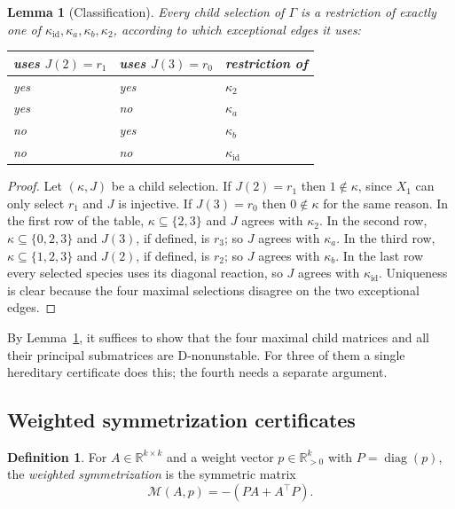 \documentclass[11pt,a4paper]{article}
\newtheorem{lemma}[theorem]{Lemma}
\theoremstyle{definition}
\newtheorem{definition}[theorem]{Definition}
\theoremstyle{remark}
\newcommand{\R}{\mathbb{R}}
\newcommand{\diag}{\operatorname{diag}}
\newcommand{\Sym}{\mathcal{M}}
\begin{document}
\begin{lemma}[Classification]\label{lem:classification}
Every child selection of $\Gamma$ is a restriction of exactly one of $\kappa_{\mathrm{id}},\kappa_a,\kappa_b,\kappa_2$, according to which exceptional edges it uses:
\begin{center}
\begin{tabular}{@{}lll@{}}
\toprule
uses $J(2)=r_1$ & uses $J(3)=r_0$ & restriction of\\
\midrule
yes & yes & $\kappa_2$\\
yes & no & $\kappa_a$\\
no & yes & $\kappa_b$\\
no & no & $\kappa_{\mathrm{id}}$\\
\bottomrule
\end{tabular}
\end{center}
\end{lemma}

\begin{proof}
Let $(\kappa,J)$ be a child selection. If $J(2)=r_1$ then $1\notin\kappa$, since $X_1$ can only select $r_1$ and $J$ is injective. If $J(3)=r_0$ then $0\notin\kappa$ for the same reason. In the first row of the table, $\kappa\subseteq\{2,3\}$ and $J$ agrees with $\kappa_2$. In the second row, $\kappa\subseteq\{0,2,3\}$ and $J(3)$, if defined, is $r_3$; so $J$ agrees with $\kappa_a$. In the third row, $\kappa\subseteq\{1,2,3\}$ and $J(2)$, if defined, is $r_2$; so $J$ agrees with $\kappa_b$. In the last row every selected species uses its diagonal reaction, so $J$ agrees with $\kappa_{\mathrm{id}}$. Uniqueness is clear because the four maximal selections disagree on the two exceptional edges.
\end{proof}

By Lemma~\ref{lem:classification}, it suffices to show that the four maximal child matrices and all their principal submatrices are D-nonunstable. For three of them a single hereditary certificate does this; the fourth needs a separate argument.

\subsection{Weighted symmetrization certificates}

\begin{definition}
For $A\in\R^{k\times k}$ and a weight vector $p\in\R^k_{>0}$ with $P=\diag(p)$, the \emph{weighted symmetrization} is the symmetric matrix
\[
\Sym(A,p)=-(PA+A^{\top}P).
\]
\end{definition}
\end{document}
